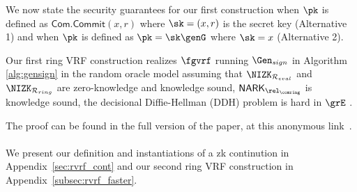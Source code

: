 We now state the security guarantees for our first construction when $ \pk $ is defined as $ \mathsf{Com}.\mathsf{Commit}(x,r) $ where $ \sk = (x, r) $ is the secret key (Alternative 1) and  when $ \pk $ is defined as $ \pk = \sk\genG $ where $ \sk = x $  (Alternative 2).
\begin{theorem}\label{thm:firstprotocol}
	Our first ring VRF construction realizes $ \fgvrf $ running $ \Gen_{sign} $ in Algorithm \ref{alg:gensign} in the random oracle model assuming that $ \NIZK_{\mathcal{R}_{eval}} $ and $ \NIZK_{\mathcal{R}_{ring}}$ are zero-knowledge and knowledge sound, $ \NARK_{\relcomring} $ is knowledge sound, the decisional Diffie-Hellman (DDH) problem is hard in $ \grE  $ . 
\end{theorem}

The proof can be found in the full version of the paper, at this anonymous link~\cite{anonymous}.
\\\\
We present our definition and instantiations of a zk continution in Appendix~\ref{sec:rvrf_cont} and our second ring VRF construction in Appendix~\ref{subsec:rvrf_faster}.

